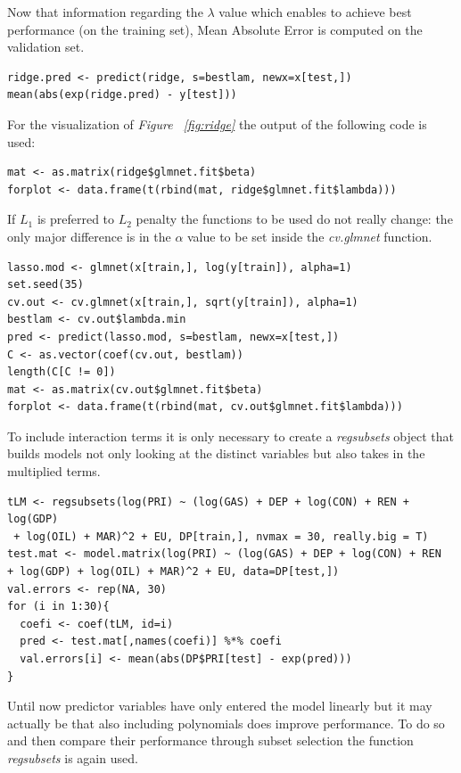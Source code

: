 \documentclass[a4paper,12pt]{book}
\begin{document}
Now that information regarding the $\lambda$ value which enables to achieve best performance (on the training set), Mean Absolute Error is computed on the validation set.

\begin{verbatim}
ridge.pred <- predict(ridge, s=bestlam, newx=x[test,])
mean(abs(exp(ridge.pred) - y[test]))
\end{verbatim}

For the visualization of \textit{Figure ~\ref{fig:ridge}} the output of the following code is used:

\begin{verbatim}
mat <- as.matrix(ridge$glmnet.fit$beta)
forplot <- data.frame(t(rbind(mat, ridge$glmnet.fit$lambda)))
\end{verbatim}

If $L_1$ is preferred to $L_2$ penalty the functions to be used do not really change: the only major difference is in the $\alpha$ value to be set inside the \textit{cv.glmnet} function.

\begin{verbatim}
lasso.mod <- glmnet(x[train,], log(y[train]), alpha=1)
set.seed(35)
cv.out <- cv.glmnet(x[train,], sqrt(y[train]), alpha=1)
bestlam <- cv.out$lambda.min
pred <- predict(lasso.mod, s=bestlam, newx=x[test,])
C <- as.vector(coef(cv.out, bestlam))
length(C[C != 0])
mat <- as.matrix(cv.out$glmnet.fit$beta)
forplot <- data.frame(t(rbind(mat, cv.out$glmnet.fit$lambda)))
\end{verbatim}

To include interaction terms it is only necessary to create a \textit{regsubsets} object that builds models not only looking at the distinct variables but also takes in the multiplied terms.

\begin{verbatim}
tLM <- regsubsets(log(PRI) ~ (log(GAS) + DEP + log(CON) + REN + log(GDP)
 + log(OIL) + MAR)^2 + EU, DP[train,], nvmax = 30, really.big = T)
test.mat <- model.matrix(log(PRI) ~ (log(GAS) + DEP + log(CON) + REN
+ log(GDP) + log(OIL) + MAR)^2 + EU, data=DP[test,])
val.errors <- rep(NA, 30)
for (i in 1:30){
  coefi <- coef(tLM, id=i)
  pred <- test.mat[,names(coefi)] %*% coefi
  val.errors[i] <- mean(abs(DP$PRI[test] - exp(pred)))
}
\end{verbatim}

Until now predictor variables have only entered the model linearly but it may actually be that also including polynomials does improve performance. To do so and then compare their performance through subset selection the function \textit{regsubsets} is again used.
\end{document}
